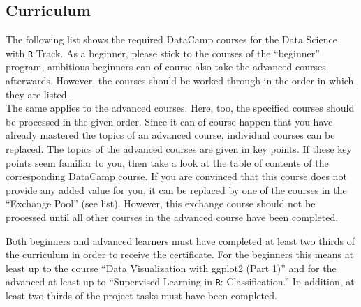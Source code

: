 \documentclass[
  11pt,
]{book}
\begin{document}
\hypertarget{curriculum}{%
\subsection{Curriculum}\label{curriculum}}

The following list shows the required DataCamp courses for the Data
Science with \texttt{R} Track. As a beginner, please stick to the
courses of the ``beginner'' program, ambitious beginners can of course
also take the advanced courses afterwards. However, the courses should
be worked through in the order in which they are listed.\\
The same applies to the advanced courses. Here, too, the specified
courses should be processed in the given order. Since it can of course
happen that you have already mastered the topics of an advanced course,
individual courses can be replaced. The topics of the advanced courses
are given in key points. If these key points seem familiar to you, then
take a look at the table of contents of the corresponding DataCamp
course. If you are convinced that this course does not provide any added
value for you, it can be replaced by one of the courses in the
``Exchange Pool'' (see list). However, this exchange course should not
be processed until all other courses in the advanced course have been
completed.

Both beginners and advanced learners must have completed at least two
thirds of the curriculum in order to receive the certificate. For the
beginners this means at least up to the course ``Data Visualization with
ggplot2 (Part 1)'' and for the advanced at least up to ``Supervised
Learning in \texttt{R}: Classification.'' In addition, at least two
thirds of the project tasks must have been completed.
\end{document}
